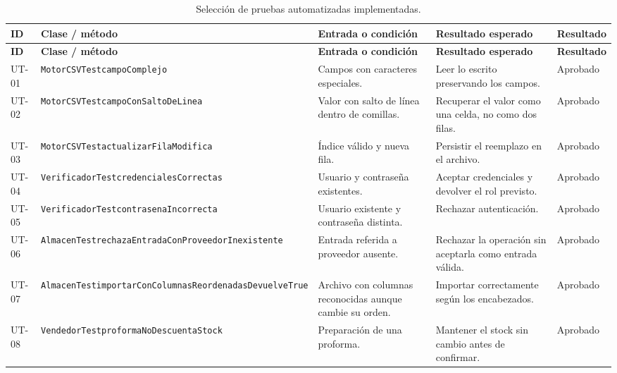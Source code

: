 \small
\begin{longtable}{|p{1cm}|p{3.4cm}|p{3.4cm}|p{3.1cm}|p{2.1cm}|}
\caption{Selección de pruebas automatizadas implementadas.}
\label{tab:casos-prueba}\\
\hline
\textbf{ID} & \textbf{Clase / método} & \textbf{Entrada o condición} & \textbf{Resultado esperado} & \textbf{Resultado}\\
\hline
\endfirsthead
\hline
\textbf{ID} & \textbf{Clase / método} & \textbf{Entrada o condición} & \textbf{Resultado esperado} & \textbf{Resultado}\\
\hline
\endhead
UT-01 & \texttt{MotorCSVTest}\newline\texttt{campoComplejo} & Campos con caracteres especiales. & Leer lo escrito preservando los campos. & Aprobado\\
\hline
UT-02 & \texttt{MotorCSVTest}\newline\texttt{campoCon\allowbreak SaltoDe\allowbreak Linea} & Valor con salto de línea dentro de comillas. & Recuperar el valor como una celda, no como dos filas. & Aprobado\\
\hline
UT-03 & \texttt{MotorCSVTest}\newline\texttt{actualizarFila\allowbreak Modifica} & Índice válido y nueva fila. & Persistir el reemplazo en el archivo. & Aprobado\\
\hline
UT-04 & \texttt{VerificadorTest}\newline\texttt{credenciales\allowbreak Correctas} & Usuario y contraseña existentes. & Aceptar credenciales y devolver el rol previsto. & Aprobado\\
\hline
UT-05 & \texttt{VerificadorTest}\newline\texttt{contrasena\allowbreak Incorrecta} & Usuario existente y contraseña distinta. & Rechazar autenticación. & Aprobado\\
\hline
UT-06 & \texttt{AlmacenTest}\newline\texttt{rechazaEntrada\allowbreak ConProveedor\allowbreak Inexistente} & Entrada referida a proveedor ausente. & Rechazar la operación sin aceptarla como entrada válida. & Aprobado\\
\hline
UT-07 & \texttt{AlmacenTest}\newline\texttt{importarCon\allowbreak Columnas\allowbreak Reordenadas\allowbreak DevuelveTrue} & Archivo con columnas reconocidas aunque cambie su orden. & Importar correctamente según los encabezados. & Aprobado\\
\hline
UT-08 & \texttt{VendedorTest}\newline\texttt{proformaNo\allowbreak DescuentaStock} & Preparación de una proforma. & Mantener el stock sin cambio antes de confirmar. & Aprobado\\

\end{longtable}
